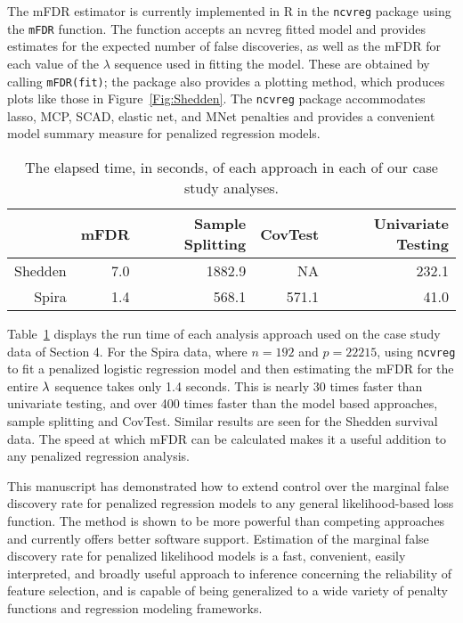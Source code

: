 The mFDR estimator is currently implemented in R in the {\tt ncvreg} package \citep{Breheny2011} using the {\tt mFDR} function. The function accepts an ncvreg fitted model and provides estimates for the expected number of false discoveries, as well as the mFDR for each value of the $\lambda$ sequence used in fitting the model.  These are obtained by calling {\tt mFDR(fit)}; the package also provides a plotting method, which produces plots like those in Figure~\ref{Fig:Shedden}.  The {\tt ncvreg} package accommodates lasso, MCP, SCAD, elastic net, and MNet \citep{Huang2016} penalties and provides a convenient model summary measure for penalized regression models.

\begin{table}[ht]
 \caption{\label{Tab:time} The elapsed time, in seconds, of each approach in each of our case study analyses.}
\centering
\begin{tabular}{rrrrr}
  \hline
 & mFDR & Sample Splitting & CovTest & Univariate Testing \\ 
  \hline
	Shedden & 7.0 & 1882.9 & NA & 232.1 \\
Spira & 1.4 & 568.1 & 571.1 & 41.0 \\ 
   \hline
\end{tabular}
\end{table}

Table~\ref{Tab:time} displays the run time of each analysis approach used on the case study data of Section 4. For the Spira data, where $n = 192$ and $p =22215$, using {\tt ncvreg} to fit a penalized logistic regression model and then estimating the mFDR for the entire $\lambda$ sequence takes only 1.4 seconds. This is nearly 30 times faster than univariate testing, and over 400 times faster than the model based approaches, sample splitting and CovTest.  Similar results are seen for the Shedden survival data.  The speed at which mFDR can be calculated makes it a useful addition to any penalized regression analysis.

This manuscript has demonstrated how to extend control over the marginal false discovery rate for penalized regression models to any general likelihood-based loss function.  The method is shown to be more powerful than competing approaches and currently offers better software support.  Estimation of the marginal false discovery rate for penalized likelihood models is a fast, convenient, easily interpreted, and broadly useful approach to inference concerning the reliability of feature selection, and is capable of being generalized to a wide variety of penalty functions and regression modeling frameworks.
